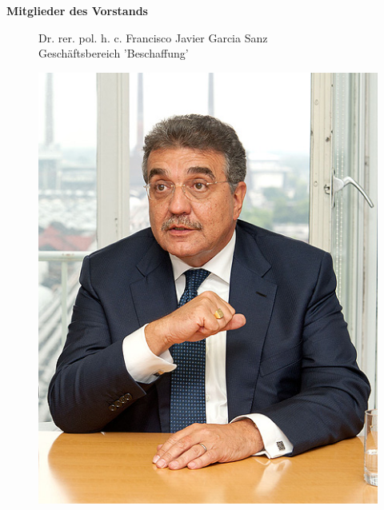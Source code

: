 \documentclass[12pt]{article}
\begin{document}
\textbf{Mitglieder des Vorstands}
\begin{figure}[here!]
	\centering
	\begin{minipage}[h]{0.65\textwidth}
		Dr. rer. pol. h. c. Francisco Javier Garcia Sanz\\
		Geschäftsbereich 'Beschaffung'
	\end{minipage}
		\begin{minipage}[h]{0.10\textwidth}
		\hspace{1cm} 
	\end{minipage}
	\begin{minipage}[h]{0.20\textwidth}
		\centering
		\includegraphics[width=1.0\textwidth]{images/FranciscoSanz.jpg}
		\label{fig:vorstandvw1}
	\end{minipage}
\end{figure}
\end{document}
